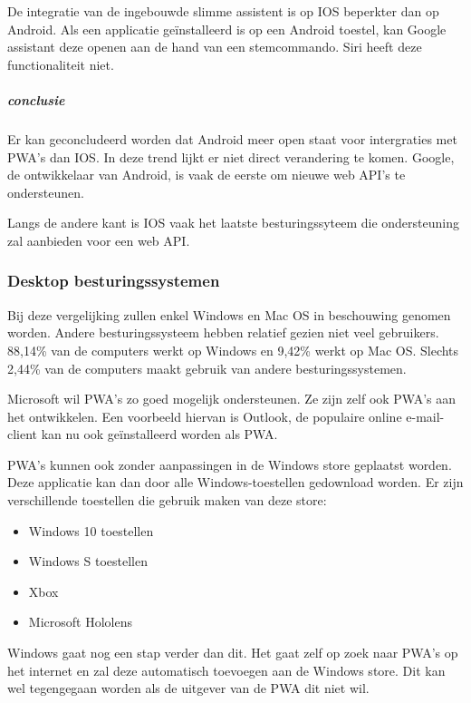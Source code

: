 	De integratie van de ingebouwde slimme assistent is op IOS beperkter dan op Android. Als een applicatie geïnstalleerd is op een Android toestel, kan Google assistant deze openen aan de hand van een stemcommando. Siri heeft deze functionaliteit niet.
	\autocite{Lathiya2020}
	
	\subparagraph{conclusie}
	
		Er kan geconcludeerd worden dat Android meer open staat voor intergraties met PWA's dan IOS. In deze trend lijkt er niet direct verandering te komen. Google, de ontwikkelaar van Android, is vaak de eerste om nieuwe web API's te ondersteunen.
		
		Langs de andere kant is IOS vaak het laatste besturingssyteem die ondersteuning zal aanbieden voor een web API.


\subsubsection{Desktop besturingssystemen}
	Bij deze vergelijking zullen enkel Windows en Mac OS in beschouwing genomen worden. Andere besturingssysteem hebben relatief gezien niet veel gebruikers. 88,14\% van de computers werkt op Windows en 9,42\% werkt op Mac OS. Slechts 2,44\% van de computers maakt gebruik van andere besturingssystemen.
	\autocite{netMarketShare2020}
	
	Microsoft wil PWA's zo goed mogelijk ondersteunen. Ze zijn zelf ook PWA's aan het ontwikkelen. Een voorbeeld hiervan is Outlook, de populaire online e-mail-client kan nu ook geïnstalleerd worden als PWA.
	\autocite{Microsoft2020a}
	
	PWA's kunnen ook zonder aanpassingen in de Windows store geplaatst worden. Deze applicatie kan dan door alle Windows-toestellen gedownload worden. Er zijn verschillende toestellen die gebruik maken van deze store:
	\begin{itemize}
		\item	Windows 10 toestellen
		\item	Windows S toestellen
		\item	Xbox
		\item	Microsoft Hololens 
	\end{itemize}
	
	Windows gaat nog een stap verder dan dit. Het gaat zelf op zoek naar PWA's op het internet en zal deze automatisch toevoegen aan de Windows store. Dit kan wel tegengegaan worden als de uitgever van de PWA dit niet wil.
	\autocite{Gustafson2017} \autocite{Gustafson2017a}
	
